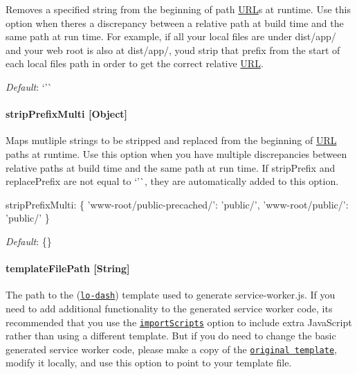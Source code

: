 Removes a specified string from the beginning of path \mbox{\hyperlink{namespace_u_r_l}{U\+RL}}\textquotesingle{}s at runtime. Use this option when there\textquotesingle{}s a discrepancy between a relative path at build time and the same path at run time. For example, if all your local files are under {\ttfamily dist/app/} and your web root is also at {\ttfamily dist/app/}, you\textquotesingle{}d strip that prefix from the start of each local file\textquotesingle{}s path in order to get the correct relative \mbox{\hyperlink{namespace_u_r_l}{U\+RL}}.

{\itshape Default}\+: `'\textquotesingle{}\`{}

\paragraph*{strip\+Prefix\+Multi \mbox{[}Object\mbox{]}}

Maps mutliple strings to be stripped and replaced from the beginning of \mbox{\hyperlink{namespace_u_r_l}{U\+RL}} paths at runtime. Use this option when you have multiple discrepancies between relative paths at build time and the same path at run time. If {\ttfamily strip\+Prefix} and {\ttfamily replace\+Prefix} are not equal to `'\textquotesingle{}\`{}, they are automatically added to this option. 
\begin{DoxyCode}
stripPrefixMulti: \{
  'www-root/public-precached/': 'public/',
  'www-root/public/': 'public/'
\}
\end{DoxyCode}


{\itshape Default}\+: {\ttfamily \{\}}

\paragraph*{template\+File\+Path \mbox{[}String\mbox{]}}

The path to the (\href{https://lodash.com/docs#template}{\tt lo-\/dash}) template used to generate {\ttfamily service-\/worker.\+js}. If you need to add additional functionality to the generated service worker code, it\textquotesingle{}s recommended that you use the \href{#importscripts-arraystring}{\tt {\ttfamily import\+Scripts}} option to include extra Java\+Script rather than using a different template. But if you do need to change the basic generated service worker code, please make a copy of the \href{https://github.com/googlechrome/sw-precache/blob/master/service-worker.tmpl}{\tt original template}, modify it locally, and use this option to point to your template file.

